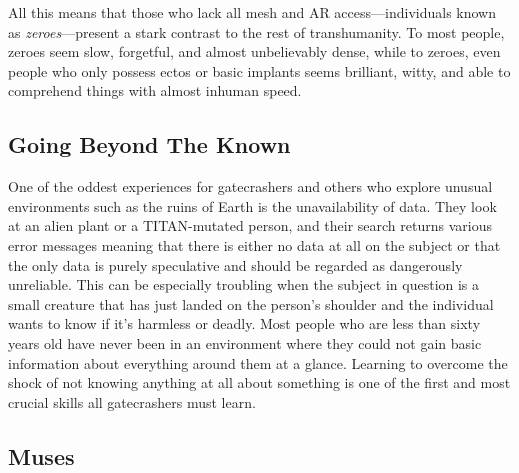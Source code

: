 All this means that those who lack all mesh and AR 
access—individuals known as \textit{zeroes}—present a stark 
contrast to the rest of transhumanity. To most people, 
zeroes seem slow, forgetful, and almost unbelievably 
dense, while to zeroes, even people who only possess 
ectos or basic implants seems brilliant, witty, and able 
to comprehend things with almost inhuman speed.

\subsection{Going Beyond The Known}

One of the oddest experiences for gatecrashers and 
others who explore unusual environments such as the 
ruins of Earth is the unavailability of data. They look 
at an alien plant or a TITAN-mutated person, and 
their search returns various error messages meaning 
that there is either no data at all on the subject or 
that the only data is purely speculative and should 
be regarded as dangerously unreliable. This can be 
especially troubling when the subject in question is 
a small creature that has just landed on the person's 
shoulder and the individual wants to know if it's 
harmless or deadly. Most people who are less than 
sixty years old have never been in an environment 
where they could not gain basic information about 
everything around them at a glance. Learning to overcome the shock of not knowing anything at all about 
something is one of the first and most crucial skills all 
gatecrashers must learn.

\subsection{Muses}

